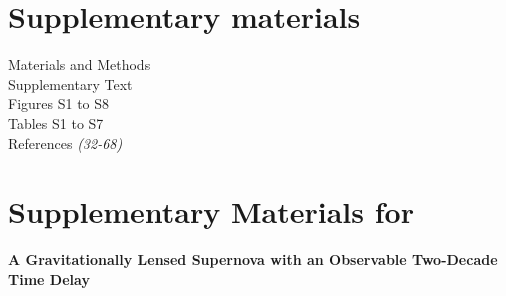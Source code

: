 \documentclass[12pt]{article}
\begin{document}

\clearpage
\section*{Supplementary materials}
Materials and Methods\\
Supplementary Text\\
Figures S1 to S8\\
Tables S1 to S7\\
References \textit{(32-68)}
\clearpage
\setcounter{table}{0}
\renewcommand{\thetable}{S\arabic{table}}

\setcounter{figure}{0}
\renewcommand{\thefigure}{S\arabic{figure}}

\setcounter{page}{1}

\section*{Supplementary Materials for}
{\bf \large A Gravitationally Lensed Supernova with an Observable Two-Decade Time Delay}
\end{document}
